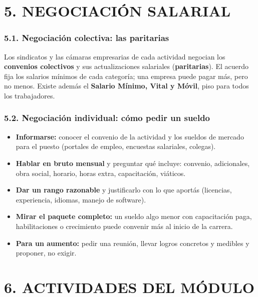 \section*{5. NEGOCIACIÓN SALARIAL}

\subsubsection*{5.1. Negociación colectiva: las paritarias}
Los sindicatos y las cámaras empresarias de cada actividad negocian los
\textbf{convenios colectivos} y sus actualizaciones salariales (\textbf{paritarias}). El
acuerdo fija los salarios mínimos de cada categoría; una empresa puede pagar más, pero no
menos. Existe además el \textbf{Salario Mínimo, Vital y Móvil}, piso para todos los
trabajadores.

\subsubsection*{5.2. Negociación individual: cómo pedir un sueldo}
\begin{itemize}
  \item \textbf{Informarse:} conocer el convenio de la actividad y los sueldos de mercado para
        el puesto (portales de empleo, encuestas salariales, colegas).
  \item \textbf{Hablar en bruto mensual} y preguntar qué incluye: convenio, adicionales,
        obra social, horario, horas extra, capacitación, viáticos.
  \item \textbf{Dar un rango razonable} y justificarlo con lo que aportás (licencias,
        experiencia, idiomas, manejo de software).
  \item \textbf{Mirar el paquete completo:} un sueldo algo menor con capacitación paga,
        habilitaciones o crecimiento puede convenir más al inicio de la carrera.
  \item \textbf{Para un aumento:} pedir una reunión, llevar logros concretos y medibles y
        proponer, no exigir.
\end{itemize}

\section*{6. ACTIVIDADES DEL MÓDULO}

